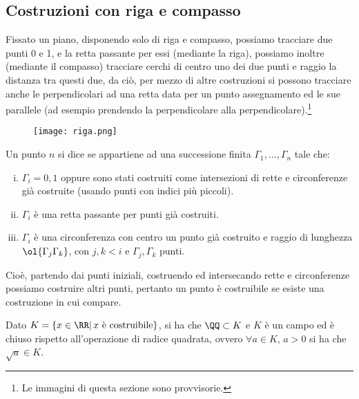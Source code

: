 \documentclass[11pt]{scrartcl}
\begin{document}
\newpage
\subsection{Costruzioni con riga e compasso}
Fissato un piano, disponendo solo di riga e compasso, possiamo tracciare due punti 0 e 1, e la retta passante per essi (mediante la riga), possiamo inoltre (mediante il compasso) tracciare cerchi di centro uno dei due punti e raggio la distanza tra questi due, da ciò, per mezzo 
di altre costruzioni si possono tracciare anche le perpendicolari ad una retta data per un punto assegnamento ed le sue parallele (ad esempio prendendo la perpendicolare alla perpendicolare).\footnote{Le immagini di questa sezione sono provvisorie.}

\begin{figure}[h]
    \centering
    \texttt{[image: riga.png]}
\end{figure}

\begin{definition}
    Un punto $n$ si dice  se appartiene ad una successione finita $\Gamma_1,\ldots,\Gamma_n$ tale che:
    \begin{enumerate}[(i)]
        \item $\Gamma_i = 0,1$ oppure sono stati costruiti come intersezioni di rette e circonferenze già costruite (usando punti con indici più piccoli).
        \item $\Gamma_i$ è una retta passante per punti già costruiti.
        \item $\Gamma_i$ è una circonferenza con centro un punto già costruito e raggio di lunghezza $\ol{\Gamma_j\Gamma_k}$, con $j,k < i$ e $\Gamma_j,\Gamma_k$ punti.
    \end{enumerate}
\end{definition}
Cioè, partendo dai punti iniziali, costruendo ed intersecando rette e circonferenze possiamo costruire altri punti, pertanto un punto è costruibile se esiste una costruzione in cui compare.

\begin{theorem}
    \label{3.73}
    Dato $K = \{x \in \RR | \, \text{$x$ è costruibile}\}$, si ha che $\QQ \subset K$ e $K$ è un campo ed è chiuso rispetto all'operazione di radice quadrata, ovvero $\forall a \in K$, $a>0$ si ha che $\sqrt{a} \in K$.
\end{theorem}
\end{document}
